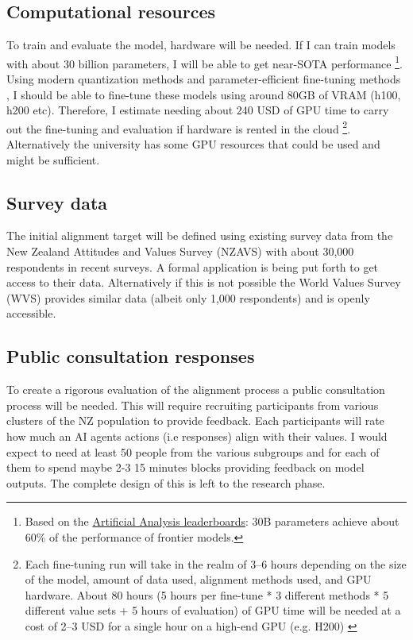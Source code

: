 \subsection{Computational resources}

To train and evaluate the model, hardware will be needed. If I can train models with about 30 billion parameters, I will be able to get near-SOTA performance \footnote{Based on the \href{https://artificialanalysis.ai/leaderboards}{Artificial Analysis leaderboards}: 30B parameters achieve about 60\% of the performance of frontier models.}. Using modern quantization methods \cite{dettmersQLoRAEfficientFinetuning2023,dettmersLLMint88bitMatrix2022} and parameter-efficient fine-tuning methods \cite{huLoRALowRankAdaptation2021,dettmersQLoRAEfficientFinetuning2023}, I should be able to fine-tune these models using around 80GB of VRAM (h100, h200 etc). Therefore, I estimate needing about 240 USD of GPU time to carry out the fine-tuning and evaluation if hardware is rented in the cloud \footnote{Each fine-tuning run will take in the realm of 3--6 hours depending on the size of the model, amount of data used, alignment methods used, and GPU hardware. About 80 hours (5 hours per fine-tune * 3 different methods * 5 different value sets + 5 hours of evaluation) of GPU time will be needed at a cost of 2--3 USD for a single hour on a high-end GPU (e.g. H200) \cite{vastai2026}}. Alternatively the university has some GPU resources that could be used and might be sufficient.

\subsection{Survey data}

The initial alignment target will be defined using existing survey data from the New Zealand Attitudes and Values Survey (NZAVS) \cite{NZAVS2025} with about 30,000 respondents in recent surveys. A formal application is being put forth to get access to their data. Alternatively if this is not possible the World Values Survey (WVS) \cite{WVS2020} provides similar data (albeit only 1,000 respondents) and is openly accessible.

\subsection{Public consultation responses}

To create a rigorous evaluation of the alignment process a public consultation process will be needed. This will require recruiting participants from various clusters of the NZ population to provide feedback. Each participants will rate how much an AI agents actions (i.e responses) align with their values. I would expect to need at least 50 people from the various subgroups and for each of them to spend maybe 2-3 15 minutes blocks providing feedback on model outputs. The complete design of this is left to the research phase.

